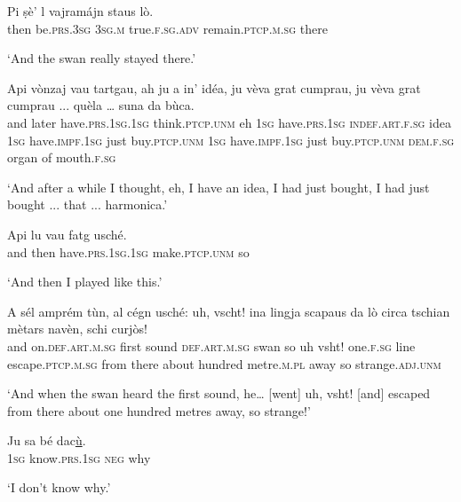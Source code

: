 \begin{linenumbers}
\gll   Pi ṣè’ l vajramájn staus lò. \\
then be.\textsc{prs.3sg} \textsc{3sg.m} true.\textsc{f.sg.adv} remain.\textsc{ptcp.m.sg} there\\
\end{linenumbers}
\medskip
\glt `And the swan really stayed there.'
\medskip

\begin{linenumbers}
\gll Api vònzaj vau tartgau, ah ju a in’ idéa, ju vèva grat cumprau, ju vèva grat cumprau ... quèla … suna da bùca.   \\
and later have.\textsc{prs.1sg.1sg} think.\textsc{ptcp.unm} eh \textsc{1sg} have.\textsc{prs.1sg} \textsc{indef.art.f.sg} idea \textsc{1sg} have.\textsc{impf.1sg} just buy.\textsc{ptcp.unm}  \textsc{1sg} have.\textsc{impf.1sg} just buy.\textsc{ptcp.unm} {} \textsc{dem.f.sg} {} organ of mouth.\textsc{f.sg} \\
\end{linenumbers}
\medskip
\glt `And after a while I thought, eh, I have an idea, I had just bought, I had just bought ... that ... harmonica.'
\medskip

\begin{linenumbers}
\gll  Api lu vau fatg usché.\footnotemark  \\
and then have.\textsc{prs.1sg.1sg} make.\textsc{ptcp.unm} so \\
\end{linenumbers}
\medskip
\glt `And then I played like this.'
\medskip

\begin{linenumbers}
\gll  A sél amprém tùn, al cégn usché: uh, vscht! ina lingja scapaus da lò circa tschian mètars navèn, schi curjòs!  \\
and on.\textsc{def.art.m.sg} first sound \textsc{def.art.m.sg} swan so uh vsht! one.\textsc{f.sg} line escape.\textsc{ptcp.m.sg} from there about hundred metre.\textsc{m.pl} away so strange.\textsc{adj.unm} \\
\end{linenumbers}
\medskip
\glt `And when the swan heard the first sound, he… [went] uh, vsht! [and] escaped from there about one hundred metres away, so strange!'
\medskip

\begin{linenumbers}
\gll Ju sa bé dac\underline{ù}.   \\
 \textsc{1sg} know.\textsc{prs.1sg} \textsc{neg} why \\
\end{linenumbers}
\medskip
\glt `I don’t know why.'
\medskip

